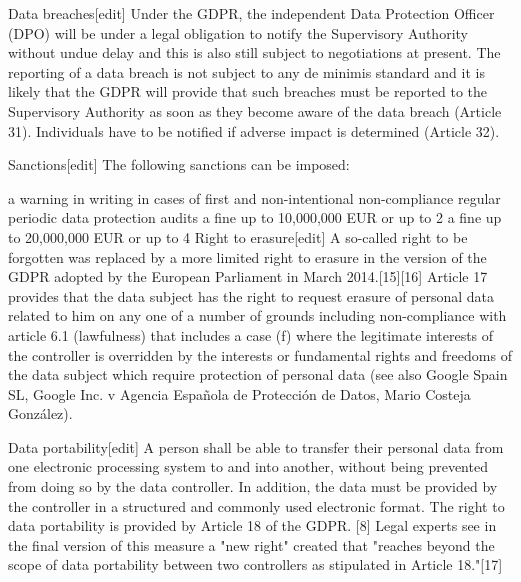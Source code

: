 Data breaches[edit]
Under the GDPR, the independent Data Protection Officer (DPO) will be under a legal obligation to notify the Supervisory Authority without undue delay and this is also still subject to negotiations at present. The reporting of a data breach is not subject to any de minimis standard and it is likely that the GDPR will provide that such breaches must be reported to the Supervisory Authority as soon as they become aware of the data breach (Article 31). Individuals have to be notified if adverse impact is determined (Article 32).

Sanctions[edit]
The following sanctions can be imposed:

a warning in writing in cases of first and non-intentional non-compliance
regular periodic data protection audits
a fine up to 10,000,000 EUR or up to 2%
a fine up to 20,000,000 EUR or up to 4%
Right to erasure[edit]
A so-called right to be forgotten was replaced by a more limited right to erasure in the version of the GDPR adopted by the European Parliament in March 2014.[15][16] Article 17 provides that the data subject has the right to request erasure of personal data related to him on any one of a number of grounds including non-compliance with article 6.1 (lawfulness) that includes a case (f) where the legitimate interests of the controller is overridden by the interests or fundamental rights and freedoms of the data subject which require protection of personal data (see also Google Spain SL, Google Inc. v Agencia Española de Protección de Datos, Mario Costeja González).

Data portability[edit]
A person shall be able to transfer their personal data from one electronic processing system to and into another, without being prevented from doing so by the data controller. In addition, the data must be provided by the controller in a structured and commonly used electronic format. The right to data portability is provided by Article 18 of the GDPR. [8] Legal experts see in the final version of this measure a "new right" created that "reaches beyond the scope of data portability between two controllers as stipulated in Article 18."[17]
